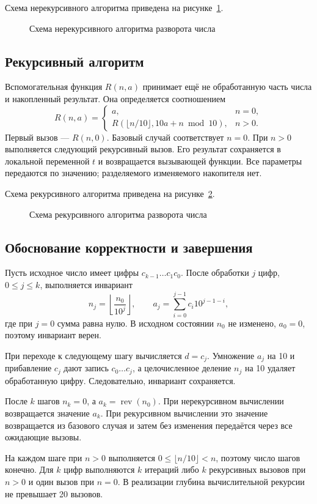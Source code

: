 \documentclass[14pt,a4paper]{extarticle}
\newcommand{\fig}[3]{\begin{figure}[H]\centering\caption{#2}\label{#3}\end{figure}}
\numberwithin{equation}{section}
\numberwithin{figure}{section}
\numberwithin{table}{section}
\begin{document}
Схема нерекурсивного алгоритма приведена на рисунке~\ref{fig:flow-i}.
\fig{flow_iterative}{Схема нерекурсивного алгоритма разворота числа}{fig:flow-i}

\clearpage\subsection{Рекурсивный алгоритм}
Вспомогательная функция $R(n,a)$ принимает ещё не обработанную часть числа и накопленный результат. Она определяется соотношением
\begin{equation}
R(n,a)=\begin{cases}
a,&n=0,\\
R(\lfloor n/10\rfloor,10a+n\bmod10),&n>0.
\end{cases}
\end{equation}
Первый вызов --- $R(n,0)$. Базовый случай соответствует $n=0$. При $n>0$ выполняется следующий рекурсивный вызов. Его результат сохраняется в локальной переменной $t$ и возвращается вызывающей функции. Все параметры передаются по значению; разделяемого изменяемого накопителя нет.

Схема рекурсивного алгоритма приведена на рисунке~\ref{fig:flow-r}.
\fig{flow_recursive}{Схема рекурсивного алгоритма разворота числа}{fig:flow-r}

\clearpage\subsection{Обоснование корректности и завершения}
Пусть исходное число имеет цифры $c_{k-1}\ldots c_1c_0$. После обработки $j$ цифр, $0\le j\le k$, выполняется инвариант
\begin{equation}
n_j=\left\lfloor\frac{n_0}{10^j}\right\rfloor,
\qquad
a_j=\sum_{i=0}^{j-1}c_i10^{j-1-i},
\end{equation}
где при $j=0$ сумма равна нулю. В исходном состоянии $n_0$ не изменено, $a_0=0$, поэтому инвариант верен.

При переходе к следующему шагу вычисляется $d=c_j$. Умножение $a_j$ на 10 и прибавление $c_j$ дают запись $c_0\ldots c_j$, а целочисленное деление $n_j$ на 10 удаляет обработанную цифру. Следовательно, инвариант сохраняется.

После $k$ шагов $n_k=0$, а $a_k=\operatorname{rev}(n_0)$. При нерекурсивном вычислении возвращается значение $a_k$. При рекурсивном вычислении это значение возвращается из базового случая и затем без изменения передаётся через все ожидающие вызовы.

На каждом шаге при $n>0$ выполняется $0\le\lfloor n/10\rfloor<n$, поэтому число шагов конечно. Для $k$ цифр выполняются $k$ итераций либо $k$ рекурсивных вызовов при $n>0$ и один вызов при $n=0$. В реализации глубина вычислительной рекурсии не превышает 20 вызовов.
\end{document}
